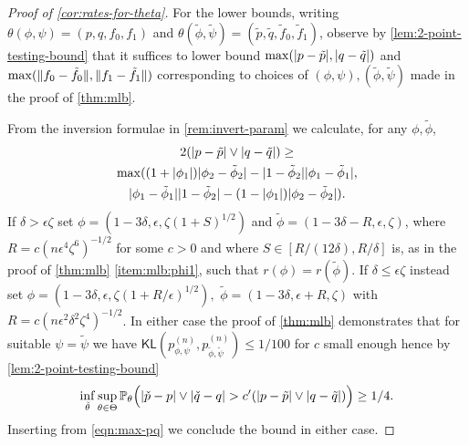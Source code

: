 \documentclass[journal]{IEEEtran}
\newcommand{\1}{\boldsymbol{1}}
\newcommand{\PP}{\mathbb{P}}
\newcommand{\KL}{\mathsf{KL}}
\DeclarePairedDelimiter{\brackets}{(}{)}
\DeclarePairedDelimiter{\norm}{\lVert}{\rVert}
\DeclarePairedDelimiter{\abs}{\lvert}{\rvert}
\begin{document}
\begin{proof}[Proof of \cref{cor:rates-for-theta}]
	For the lower bounds, writing $\theta(\phi,\psi)=(p,q,f_0,f_1)$ and $\theta(\tilde{\phi},\tilde{\psi})=(\tilde{p},\tilde{q},\tilde{f}_0,\tilde{f}_1)$, observe by \cref{lem:2-point-testing-bound} that it suffices to lower bound $\max(\abs{p-\tilde{p}},\abs{q-\tilde{q}})$ and $\max(\norm{f_0-\tilde{f}_0},\norm{f_1-\tilde{f}_1})$ corresponding to choices of $(\phi,\psi),(\tilde{\phi},\tilde{\psi})$ made in the proof of \cref{thm:mlb}.

	From the inversion formulae in \cref{rem:invert-param} we calculate, for any $\phi,\tilde{\phi}$,
	\begin{multline}
          \label{eqn:max-pq}
          2(\abs{p-\tilde{p}} \vee \abs{q-\tilde{q}})%
          \geq\\
          \max( (1+\abs{\phi_1})\abs{\phi_2-\tilde{\phi}_2}
          -\abs{1-\tilde{\phi}_2}\abs{\phi_1-\tilde{\phi}_1},\\
          \abs{\phi_1-\tilde{\phi}_1}\abs{1-\tilde{\phi}_2}-(1-\abs{\phi_1})\abs{\phi_2-\tilde{\phi}_2}).
	\end{multline}
	If $\delta>\epsilon \zeta$ set
	$\phi= (1-3\delta,\epsilon,\zeta(1+S)^{1/2})$ and $\tilde{\phi}=(1-3\delta-R,\epsilon,\zeta)$, where $R=c(n\epsilon^4\zeta^6)^{-1/2}$ for some $c>0$ and where $S\in[R/(12\delta),R/\delta]$ is, as in the proof of \cref{thm:mlb} \cref{item:mlb:phi1}, such that $r(\phi)=r(\tilde{\phi})$.  If $\delta\leq \epsilon \zeta$ instead set
	$\phi= (1-3\delta,\epsilon,\zeta(1+R/\epsilon)^{1/2}),$ $\tilde{\phi}=(1-3\delta,\epsilon+R,\zeta)$ with $R=c(n\epsilon^2\delta^2\zeta^4)^{-1/2}$. In either case the proof of \cref{thm:mlb} demonstrates that for suitable $\psi=\tilde{\psi}$ we have $\KL(p^{(n)}_{\phi,\psi},p^{(n)}_{\tilde{\phi},\tilde{\psi}})\leq 1/100$ for $c$ small enough hence by \cref{lem:2-point-testing-bound}
	\[\inf_{\check{\theta}}\sup_{\theta \in \Theta} \PP_\theta\brackets[\Big]{\abs{\check{p}-p}\vee\abs{\check{q}-q}>c'(\abs{p-\tilde{p}}\vee \abs{q-\tilde{q}})}\geq 1/4.\]
	Inserting from \cref{eqn:max-pq} we conclude the bound in either case.


\end{proof}
\end{document}
